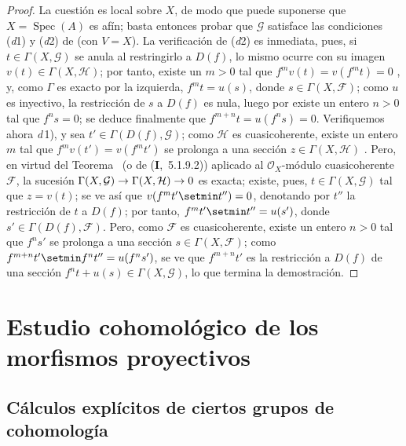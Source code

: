 \documentclass[10pt,oneside,openany]{book}
\theoremstyle{egaenv}\newtheorem*{env}{---}
\theoremstyle{egastatement}
\theoremstyle{egadescription}
\newcommand{\oldpage}[2][]{\marginnote{\normalfont\scriptsize\textbf{#1}\,|\,#2}\ignorespaces}
\renewcommand{\to}{\mathchoice{\longrightarrow}{\rightarrow}{\rightarrow}{\rightarrow}}
\begin{document}
\oldpage[III]{95}
\begin{proof}
La cuestión es local sobre $X$, de modo que puede suponerse que $X=\operatorname{Spec}(A)$ es afín; basta entonces probar que $\mathcal G$ satisface las condiciones (\textit{d}1) y (\textit{d}2) de  (con $V=X$).
La verificación de (\textit{d}2) es inmediata, pues, si $t\in\Gamma(X,\mathcal G)$ se anula al restringirlo a $D(f)$, lo mismo ocurre con su imagen $v(t)\in\Gamma(X,\mathcal H)$; por tanto, existe un $m>0$ tal que $f^mv(t)=v(f^mt)=0$ , y, como $\Gamma$ es exacto por la izquierda, $f^mt=u(s)$, donde $s\in\Gamma(X,\mathcal F)$; como $u$ es inyectivo, la restricción de $s$ a $D(f)$ es nula, luego por  existe un entero $n>0$ tal que $f^ns=0$; se deduce finalmente que $f^{m+n}t=u(f^ns)=0$. Verifiquemos ahora \textit{d}\,1), y sea $t'\in\Gamma(D(f),\mathcal G)$; como $\mathcal H$ es cuasicoherente, existe un entero $m$ tal que $f^mv(t')=v(f^mt')$ se prolonga a una sección $z\in\Gamma(X,\mathcal H)$ .
Pero, en virtud del Teorema~ (o de (\textbf{I},~5.1.9.2)) aplicado al $\mathcal O_X$-módulo cuasicoherente $\mathcal F$, la sucesión $\Gamma(X,\mathcal G)\to\Gamma(X,\mathcal H)\to0$ es exacta; existe, pues, $t\in\Gamma(X,\mathcal G)$ tal que $z=v(t)$; se ve así que $v(f^mt'\setmin t'')=0$, denotando por $t''$ la restricción de $t$ a $D(f)$; por tanto, $f^mt'\setmin t''=u(s')$, donde $s'\in\Gamma(D(f),\mathcal F)$.
Pero, como $\mathcal F$ es cuasicoherente, existe un entero $n>0$ tal que $f^ns'$ se prolonga a una sección $s\in\Gamma(X,\mathcal F)$; como $f^{m+n}t'\setmin f^nt''=u(f^ns')$, se ve que $f^{m+n}t'$ es la restricción a $D(f)$ de una sección $f^nt+u(s)\in\Gamma(X,\mathcal G)$, lo que termina la demostración.
\end{proof}



\section{Estudio cohomológico de los morfismos proyectivos}
\label{section:III.2}
\label{section:III.2-fr}


\subsection{Cálculos explícitos de ciertos grupos de cohomología}
\label{subsection:III.2.1}
\label{subsection:III.2.1-fr}
\end{document}
